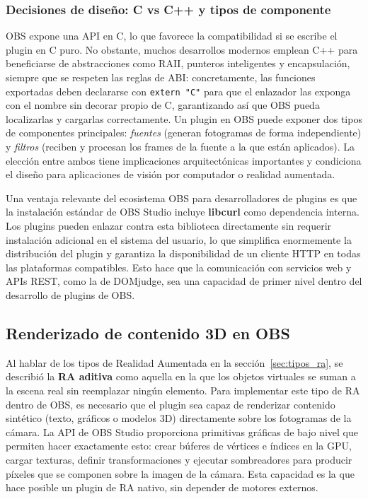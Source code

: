 \subsubsection*{Decisiones de diseño: C vs C++ y tipos de componente}
OBS expone una API en C, lo que favorece la compatibilidad si se escribe el plugin en C puro. No obstante, muchos desarrollos modernos emplean C++ para beneficiarse de abstracciones como RAII, punteros inteligentes y encapsulación, siempre que se respeten las reglas de ABI: concretamente, las funciones exportadas deben declararse con \verb|extern "C"| para que el enlazador las exponga con el nombre sin decorar propio de C, garantizando así que OBS pueda localizarlas y cargarlas correctamente. Un plugin en OBS puede exponer dos tipos de componentes principales: \emph{fuentes} (generan fotogramas de forma independiente) y \emph{filtros} (reciben y procesan los frames de la fuente a la que están aplicados). La elección entre ambos tiene implicaciones arquitectónicas importantes y condiciona el diseño para aplicaciones de visión por computador o realidad aumentada.

Una ventaja relevante del ecosistema OBS para desarrolladores de plugins es que la instalación estándar de OBS Studio incluye \textbf{libcurl} como dependencia interna. Los plugins pueden enlazar contra esta biblioteca directamente sin requerir instalación adicional en el sistema del usuario, lo que simplifica enormemente la distribución del plugin y garantiza la disponibilidad de un cliente HTTP en todas las plataformas compatibles. Esto hace que la comunicación con servicios web y APIs REST, como la de DOMjudge, sea una capacidad de primer nivel dentro del desarrollo de plugins de OBS.

\subsection{Renderizado de contenido 3D en OBS}
\label{subsec:obs_modelos_3d}

Al hablar de los tipos de Realidad Aumentada en la sección~\ref{sec:tipos_ra}, se describió la \textbf{RA aditiva} como aquella en la que los objetos virtuales se suman a la escena real sin reemplazar ningún elemento. Para implementar este tipo de RA dentro de OBS, es necesario que el plugin sea capaz de renderizar contenido sintético (texto, gráficos o modelos 3D) directamente sobre los fotogramas de la cámara. La API de OBS Studio proporciona primitivas gráficas de bajo nivel que permiten hacer exactamente esto: crear búferes de vértices e índices en la GPU, cargar texturas, definir transformaciones y ejecutar sombreadores para producir píxeles que se componen sobre la imagen de la cámara. Esta capacidad es la que hace posible un plugin de RA nativo, sin depender de motores externos.

